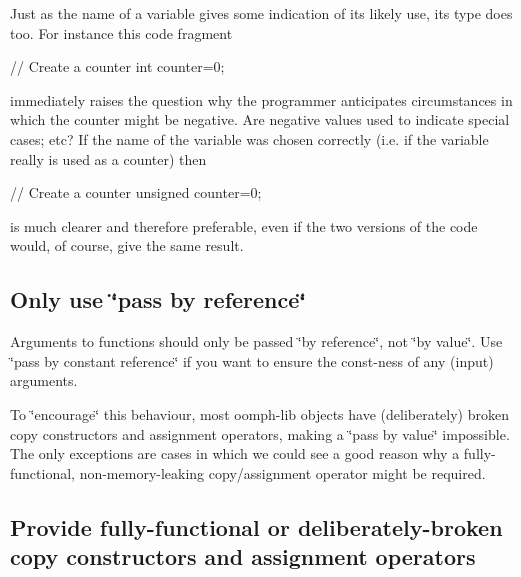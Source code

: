 \begin{DoxyItemize}
\item Just as the name of a variable gives some indication of its likely use, its type does too. For instance this code fragment \par
 
\begin{DoxyCode}
\textcolor{comment}{// Create a counter}
\textcolor{keywordtype}{int} counter=0;
\end{DoxyCode}
 \par
 immediately raises the question why the programmer anticipates circumstances in which the counter might be negative. Are negative values used to indicate special cases; etc? If the name of the variable was chosen correctly (i.\-e. if the variable really is used as a counter) then \par
 
\begin{DoxyCode}
\textcolor{comment}{// Create a counter}
\textcolor{keywordtype}{unsigned} counter=0;
\end{DoxyCode}
 \par
 is much clearer and therefore preferable, even if the two versions of the code would, of course, give the same result.
\end{DoxyItemize}\hypertarget{index_pass_by_reference}{}\subsection{Only use \char`\"{}pass by reference\char`\"{}}\label{index_pass_by_reference}

\begin{DoxyItemize}
\item Arguments to functions should only be passed \char`\"{}by reference\char`\"{}, not \char`\"{}by value\char`\"{}. Use \char`\"{}pass by constant reference\char`\"{} if you want to ensure the const-\/ness of any (input) arguments.
\item To \char`\"{}encourage\char`\"{} this behaviour, most {\ttfamily oomph-\/lib} objects have (deliberately) broken copy constructors and assignment operators, making a \char`\"{}pass by value\char`\"{} impossible. The only exceptions are cases in which we could see a good reason why a fully-\/functional, non-\/memory-\/leaking copy/assignment operator might be required.
\end{DoxyItemize}\hypertarget{index_break_copy}{}\subsection{Provide fully-\/functional or deliberately-\/broken copy constructors and assignment operators}\label{index_break_copy}

